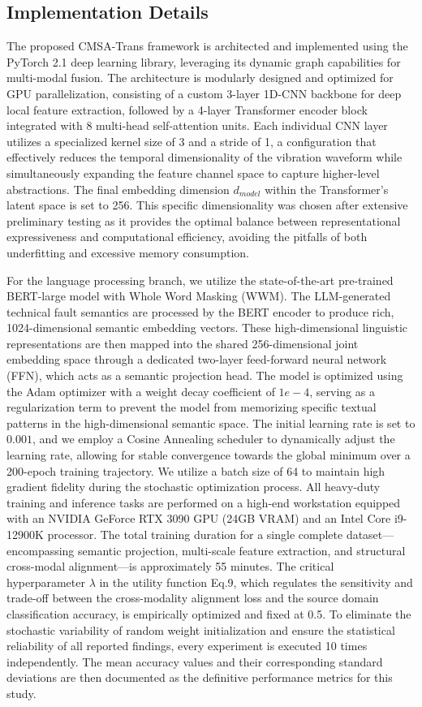 \documentclass[journal]{IEEEtran}
\begin{document}
\subsection{Implementation Details}
The proposed CMSA-Trans framework is architected and implemented using the PyTorch 2.1 deep learning library, leveraging its dynamic graph capabilities for multi-modal fusion. The architecture is modularly designed and optimized for GPU parallelization, consisting of a custom 3-layer 1D-CNN backbone for deep local feature extraction, followed by a 4-layer Transformer encoder block integrated with 8 multi-head self-attention units. Each individual CNN layer utilizes a specialized kernel size of 3 and a stride of 1, a configuration that effectively reduces the temporal dimensionality of the vibration waveform while simultaneously expanding the feature channel space to capture higher-level abstractions. The final embedding dimension $d_{model}$ within the Transformer's latent space is set to 256. This specific dimensionality was chosen after extensive preliminary testing as it provides the optimal balance between representational expressiveness and computational efficiency, avoiding the pitfalls of both underfitting and excessive memory consumption. 

For the language processing branch, we utilize the state-of-the-art pre-trained BERT-large model with Whole Word Masking (WWM). The LLM-generated technical fault semantics are processed by the BERT encoder to produce rich, 1024-dimensional semantic embedding vectors. These high-dimensional linguistic representations are then mapped into the shared 256-dimensional joint embedding space through a dedicated two-layer feed-forward neural network (FFN), which acts as a semantic projection head. The model is optimized using the Adam optimizer with a weight decay coefficient of $1e-4$, serving as a regularization term to prevent the model from memorizing specific textual patterns in the high-dimensional semantic space. The initial learning rate is set to $0.001$, and we employ a Cosine Annealing scheduler to dynamically adjust the learning rate, allowing for stable convergence towards the global minimum over a 200-epoch training trajectory. We utilize a batch size of 64 to maintain high gradient fidelity during the stochastic optimization process. All heavy-duty training and inference tasks are performed on a high-end workstation equipped with an NVIDIA GeForce RTX 3090 GPU (24GB VRAM) and an Intel Core i9-12900K processor. The total training duration for a single complete dataset—encompassing semantic projection, multi-scale feature extraction, and structural cross-modal alignment—is approximately 55 minutes. The critical hyperparameter $\lambda$ in the utility function Eq.9, which regulates the sensitivity and trade-off between the cross-modality alignment loss and the source domain classification accuracy, is empirically optimized and fixed at 0.5. To eliminate the stochastic variability of random weight initialization and ensure the statistical reliability of all reported findings, every experiment is executed 10 times independently. The mean accuracy values and their corresponding standard deviations are then documented as the definitive performance metrics for this study.
\end{document}
